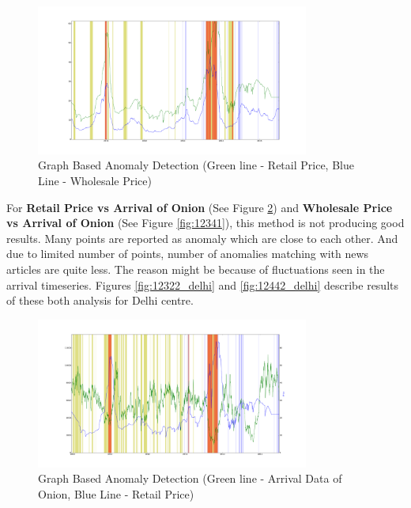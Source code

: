 			\begin{figure}[H]
		    	\centering
  		    	\includegraphics[width=0.8\textwidth]{graphs/12331.png}
		    	\caption{Graph Based Anomaly Detection (Green line - Retail Price, Blue Line - Wholesale Price)}
		    	\label{fig:12331}
			\end{figure}
	
	For \textbf{Retail Price vs Arrival of Onion} (See Figure \ref{fig:12321}) and \textbf{Wholesale Price vs Arrival of Onion} (See Figure \ref{fig:12341}), this method is not producing good results. Many points are reported as anomaly which are close to each other. And due to limited number of points, number of anomalies matching with news articles are quite less. The reason might be because of fluctuations seen in the arrival timeseries. Figures \ref{fig:12322_delhi} and \ref{fig:12442_delhi} describe results of these both analysis for Delhi centre.
			\begin{figure}[H]
		    	\centering
  		    	\includegraphics[width=0.8\textwidth]{graphs/12321.png}
		    	\caption{Graph Based Anomaly Detection (Green line - Arrival Data of Onion, Blue Line - Retail Price)}
		    	\label{fig:12321}
			\end{figure}
			
